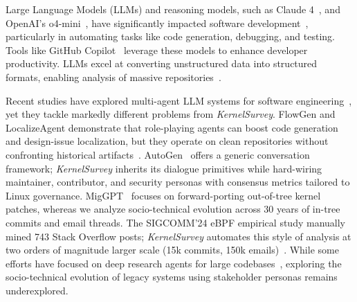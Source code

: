 \documentclass[sigconf,review,anonymous]{acmart}
\newcommand{\sys}{\textit{KernelSurvey}\xspace}
\begin{document}
Large Language Models (LLMs) and reasoning models, such as Claude 4~\cite{claude4}, and OpenAI's o4-mini~\cite{o4mini}, have significantly impacted software development~\cite{jin2024llms}, particularly in automating tasks like code generation, debugging, and testing. Tools like GitHub Copilot~\cite{copilot} leverage these models to enhance developer productivity. LLMs excel at converting unstructured data into structured formats, enabling analysis of massive repositories~\cite{llmchatbotsmsr2024}.

Recent studies have explored multi-agent LLM systems for software engineering~\cite{lmase2024,agent4se2024}, yet they tackle markedly different problems from \sys. FlowGen and LocalizeAgent demonstrate that role-playing agents can boost code generation and design-issue localization, but they operate on clean repositories without confronting historical artifacts~\cite{Lin2025FlowGen,Batole2025LocalizeAgent}. AutoGen~\cite{Wu2023AutoGen} offers a generic conversation framework; \sys inherits its dialogue primitives while hard-wiring maintainer, contributor, and security personas with consensus metrics tailored to Linux governance. MigGPT~\cite{Dang2025MigGPT} focuses on forward-porting out-of-tree kernel patches, whereas we analyze socio-technical evolution across 30 years of in-tree commits and email threads. The SIGCOMM'24 eBPF empirical study manually mined 743 Stack Overflow posts; \sys automates this style of analysis at two orders of magnitude larger scale (15k commits, 150k emails)~\cite{Deokar2024eBPFChallenges}. While some efforts have focused on deep research agents for large codebases~\cite{coderesearcher2025}, exploring the socio-technical evolution of legacy systems using stakeholder personas remains underexplored.
\end{document}
